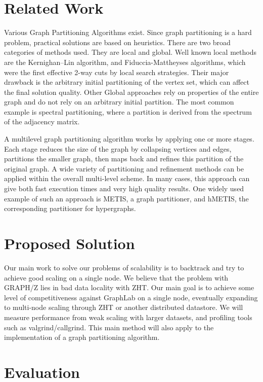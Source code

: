 \documentclass[10pt]{article}
\begin{document}
\begin{multicols}{2}
  \section{Related Work}
  Various Graph Partitioning Algorithms exist. Since graph partitioning is a hard problem, practical solutions are based on heuristics. There are two broad categories of methods used. They are local and global. Well known local methods are the Kernighan–Lin algorithm, and Fiduccia-Mattheyses algorithms, which were the first effective 2-way cuts by local search strategies. Their major drawback is the arbitrary initial partitioning of the vertex set, which can affect the final solution quality. Other Global approaches rely on properties of the entire graph and do not rely on an arbitrary initial partition. The most common example is spectral partitioning, where a partition is derived from the spectrum of the adjacency matrix.

  A multilevel graph partitioning algorithm works by applying one or more stages. Each stage reduces the size of the graph by collapsing vertices and edges, partitions the smaller graph, then maps back and refines this partition of the original graph. A wide variety of partitioning and refinement methods can be applied within the overall multi-level scheme. In many cases, this approach can give both fast execution times and very high quality results. One widely used example of such an approach is METIS, a graph partitioner, and hMETIS, the corresponding partitioner for hypergraphs.

  
  \section{Proposed Solution}
  Our main work to solve our problems of scalability is to backtrack and try to achieve good scaling on a single node. We believe that the problem with GRAPH/Z lies in bad data locality with ZHT. Our main goal is to achieve some level of competitiveness against GraphLab on a single node, eventually expanding to multi-node scaling through ZHT or another distributed datastore. We will measure performance from weak scaling with larger datasets, and profiling tools such as valgrind/callgrind. This main method will also apply to the implementation of a graph partitioning algorithm.
  
  \section{Evaluation}
 

\end{multicols}
\end{document}
